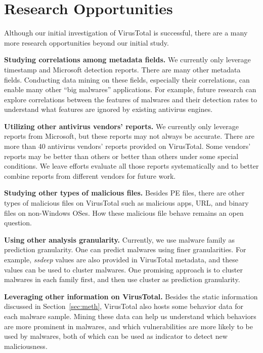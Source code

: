 \section{Research Opportunities}
\label{sec:oppo}

Although our initial investigation of VirusTotal is successful, 
there are a many more research opportunities beyond our initial study.

{\bf Studying correlations among metadata fields.} 
We currently only leverage timestamp and Microsoft detection reports. 
There are many other metadata fields. 
Conducting data mining on these fields, especially their correlations, can enable 
many other ``big malwares'' applications. 
For example, future research can explore correlations between the features of malwares and 
their detection rates to understand what features are ignored by existing antivirus engines. 

{\bf Utilizing other antivirus vendors' reports.}
We currently only leverage reports from Microsoft, but these reports may not always be accurate.
There are more than 40 antivirus vendors' reports provided on VirusTotal.
Some vendors’ reports may be better than others or better than others under some special conditions. 
We leave efforts evaluate all those reports systematically and to better combine reports from different vendors for future work. 

{\bf Studying other types of malicious files. }
Besides PE files, there are other types of malicious files on VirusTotal such as malicious apps, 
URL, and binary files on non-Windows OSes. 
How these malicious file behave remains an open question.

{\bf Using other analysis granularity.}
Currently, we use malware family as prediction granularity. 
One can predict malwares using finer granularities. 
For example, {\em ssdeep} values are also provided in VirusTotal metadata, 
and these values can be used to cluster malwares. 
One promising approach is to cluster malwares in each family first, and then use cluster as prediction granularity. 

{\bf Leveraging other information on VirusTotal.}
Besides the static information discussed in Section~\ref{sec:meth}, 
VirusTotal also hosts some behavior data for each malware sample. 
Mining these data can help us understand which behaviors are more prominent in malwares, 
and which vulnerabilities are more likely to be used by malwares, both of which can be used as indicator to detect new maliciousness. 

